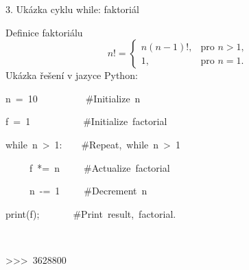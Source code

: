 \documentclass[czech]{beamer}
\newenvironment{lyxcode}
  {\par\begin{list}{}{
    \setlength{\rightmargin}{\leftmargin}
    \setlength{\listparindent}{0pt}%
    \raggedright
    \setlength{\itemsep}{0pt}
    \setlength{\parsep}{0pt}
    \normalfont\ttfamily}%
   \def\{{\char`\{}
   \def\}{\char`\}}
   \def\textasciitilde{\char`\~}
   \item[]}
  {\end{list}}
\begin{document}
\begin{frame}{3. Ukázka cyklu while: faktoriál}

Definice faktoriálu
\[
n!=\begin{cases}
n(n-1)!, & \mbox{pro }n>1,\\
1, & \mbox{pro }n=1.
\end{cases}
\]
Ukázka řešení v jazyce Python:
\begin{lyxcode}
n~=~10~~~~~~~~~~\#Initialize~n

f~=~1~~~~~~~~~~~\#Initialize~factorial

while~n~>~1:~~~~\#Repeat,~while~n~>~1~

~~~~~f~{*}=~n~~~~~\#Actualize~factorial

~~~~~n~-=~1~~~~~\#Decrement~n

print(f);~~~~~~~\#Print~result,~factorial.

~

>\textcompwordmark >\textcompwordmark >~3628800

~
\end{lyxcode}
\end{frame}
\end{document}
